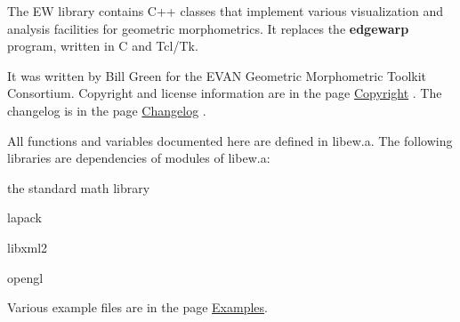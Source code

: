 The EW library contains C++ classes that implement various visualization and analysis facilities for geometric morphometrics. It replaces the {\bfseries edgewarp} program, written in C and Tcl/Tk.

It was written by Bill Green for the EVAN Geometric Morphometric Toolkit Consortium. Copyright and license information are in the page \hyperlink{copyright}{Copyright} . The changelog is in the page \hyperlink{changelog}{Changelog} .

All functions and variables documented here are defined in {\ttfamily libew.a}. The following libraries are dependencies of modules of {\ttfamily libew.a:} 
\begin{DoxyItemize}
\item the standard math library
\item lapack
\item libxml2
\item opengl
\end{DoxyItemize}

Various example files are in the page \hyperlink{examples}{Examples}. 